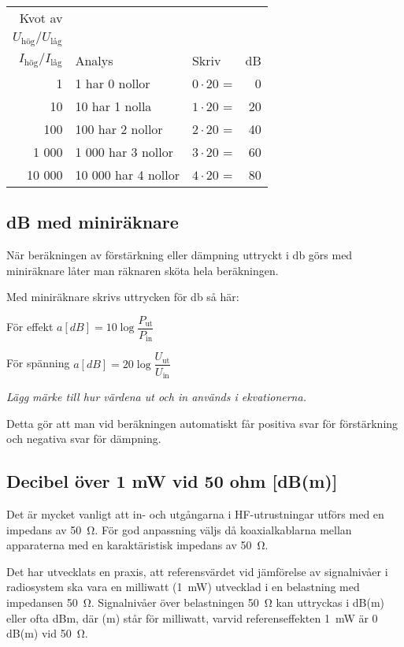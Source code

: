 \begin{center}
\begin{tabular}{rllr}
  Kvot av & & & \\
\(U_{\text{hög}}/U_{\text{låg}}\) &          &                  &    \\
\(I_{\text{hög}}/I_{\text{låg}}\) & Analys             & Skriv            & dB \\
  \hline
     1 & 1 har 0 nollor      & \(0 \cdot 20\) = &  0 \\
    10 & 10 har 1 nolla      & \(1 \cdot 20\) = & 20 \\
   100 & 100 har 2 nollor    & \(2 \cdot 20\) = & 40 \\
 1 000 &  1 000 har 3 nollor & \(3 \cdot 20\) = & 60 \\
10 000 & 10 000 har 4 nollor & \(4 \cdot 20\) = & 80
\end{tabular}
\end{center}

\subsection{dB med miniräknare}

När beräkningen av förstärkning eller dämpning uttryckt i \unit{\decibel} görs
med miniräknare låter man räknaren sköta hela beräkningen.

Med miniräknare skrivs uttrycken för \unit{\decibel} så här:

För effekt \(a[dB] = 10\log \dfrac{P_{\text{ut}}}{P_{\text{in}}}\)

För spänning \(a[dB] = 20\log \dfrac{U_{\text{ut}}}{U_{\text{in}}}\)

\emph{Lägg märke till hur värdena ut och in används i ekvationerna.}

Detta gör att man vid beräkningen automatiskt får positiva svar för
förstärkning och negativa svar för dämpning.

\subsection{Decibel över 1 mW vid 50 ohm [dB(m)]}
\label{dBm}

Det är mycket vanligt att in- och utgångarna i HF-utrustningar utförs
med en impedans av \qty{50}{\ohm}.
För god anpassning väljs då koaxialkablarna mellan apparaterna med en
karaktäristisk impedans av \qty{50}{\ohm}.

Det har utvecklats en praxis, att referensvärdet vid jämförelse av signalnivåer
i radiosystem ska vara en milliwatt (\qty{1}{\milli\watt}) utvecklad i en
belastning med impedansen \qty{50}{\ohm}.
Signalnivåer över belastningen \qty{50}{\ohm} kan uttryckas i dB(m) eller ofta
dBm, där (m) står för milliwatt, varvid referenseffekten \qty{1}{\milli\watt} är
0\,dB(m) vid \qty{50}{\ohm}.

